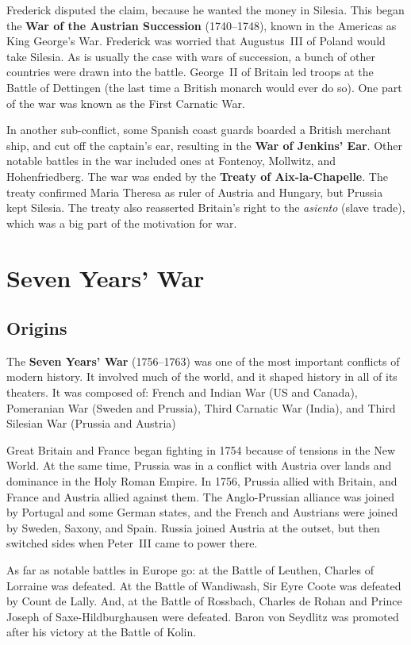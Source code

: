 Frederick disputed the claim, because he wanted the money in Silesia.
This began the \textbf{War of the Austrian Succession} (1740--1748),
known in the Americas as King George's War.
Frederick was worried that Augustus~III of Poland would take Silesia.
As is usually the case with wars of succession, a bunch of other countries were drawn into the battle.
George~II of Britain led troops at the Battle of Dettingen (the last time a British monarch would ever do so).
One part of the war was known as the First Carnatic War.

In another sub-conflict, some Spanish coast guards boarded a British merchant ship,
and cut off the captain's ear, resulting in the \textbf{War of Jenkins' Ear}.
Other notable battles in the war included ones at Fontenoy, Mollwitz, and Hohenfriedberg.
The war was ended by the \textbf{Treaty of Aix-la-Chapelle}.
The treaty confirmed Maria Theresa as ruler of Austria and Hungary, but Prussia kept Silesia.
The treaty also reasserted Britain's right to the \textit{asiento} (slave trade),
which was a big part of the motivation for war.

\section{Seven Years' War}

\subsection*{Origins}

The \textbf{Seven Years' War} (1756--1763) was one of the most important conflicts of modern history.
It involved much of the world, and it shaped history in all of its theaters.
It was composed of:
French and Indian War (US and Canada),
Pomeranian War (Sweden and Prussia),
Third Carnatic War (India),
and Third Silesian War (Prussia and Austria)

Great Britain and France began fighting in 1754 because of tensions in the New World.
At the same time, Prussia was in a conflict with Austria over lands and dominance in the Holy Roman Empire.
In 1756, Prussia allied with Britain, and France and Austria allied against them.
The Anglo-Prussian alliance was joined by Portugal and some German states,
and the French and Austrians were joined by Sweden, Saxony, and Spain.
Russia joined Austria at the outset, but then switched sides when Peter~III came to power there.

As far as notable battles in Europe go: at the Battle of Leuthen, Charles of Lorraine was defeated.
At the Battle of Wandiwash, Sir Eyre Coote was defeated by Count de Lally.
And, at the Battle of Rossbach, Charles de Rohan and Prince Joseph of Saxe-Hildburghausen were defeated.
Baron von Seydlitz was promoted after his victory at the Battle of Kolin.

